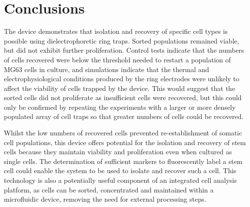 \section{Conclusions}
The device demonstrates that isolation and recovery of specific cell types is possible using dielectrophoretic ring traps. Sorted populations remained viable, but did not exhibit further proliferation. Control tests indicate that the numbers of cells recovered were below the threshold needed to restart a population of MG63 cells in culture, and simulations indicate that the thermal and electrophysiological conditions produced by the ring electrodes were unlikely to affect the viability of cells trapped by the device. This would suggest that the sorted cells did not proliferate as insufficient cells were recovered, but this could only be confirmed by repeating the experiments with a larger or more densely populated array of cell traps so that greater numbers of cells could be recovered. 

Whilst the low numbers of recovered cells prevented re-establishment of somatic cell populations, this device offers potential for the isolation and recovery of stem cells because they maintain viability and proliferation even when cultured as single cells. The determination of sufficient markers to fluorescently label a stem cell could enable the system to be used to isolate and recover such a cell. This technology is also a potentially useful component of an integrated cell analysis platform, as cells can be sorted, concentrated and maintained within a microfluidic device, removing the need for external processing steps.
